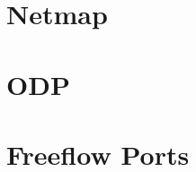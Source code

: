 \section{Netmap}
\label{hardware:netmap}

\section{ODP}
\label{hardware:odp}

\section{Freeflow Ports}
\label{hardware:ffports}
